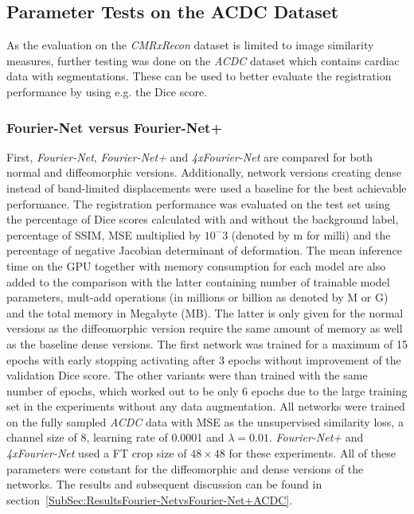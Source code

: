 \documentclass[english,version-2022-01]{uzl-thesis} %
\begin{document}
\subsection{Parameter Tests on the ACDC Dataset} \label{SubSec:ParameterTestsACDC}
As the evaluation on the \emph{CMRxRecon} dataset is limited to image similarity measures, further testing was done on the \emph{ACDC} dataset which contains cardiac data with segmentations. These can be used to better evaluate the registration performance by using e.g. the Dice score.


\subsubsection{Fourier-Net versus Fourier-Net+} \label{SubSubSec:Fourier-NetvsFourier-Net+}
First, \emph{Fourier-Net}, \emph{Fourier-Net+} and \emph{4xFourier-Net} are compared for both normal and diffeomorphic versions. Additionally, network versions creating dense instead of band-limited displacements were used a baseline for the best achievable performance. The registration performance was evaluated on the test set using the percentage of Dice scores calculated with and without the background label, percentage of SSIM, MSE multiplied by $10^-3$ (denoted by m for milli) and the percentage of negative Jacobian determinant of deformation. The mean inference time on the GPU together with memory consumption for each model are also added to the comparison with the latter containing number of trainable model parameters, mult-add operations (in millions or billion as denoted by M or G) and the total memory in Megabyte (MB). The latter is only given for the normal versions as the diffeomorphic version require the same amount of memory as well as the baseline dense versions. The first network was trained for a maximum of 15 epochs with early stopping activating after 3 epochs without improvement of the validation Dice score. The other variants were than trained with the same number of epochs, which worked out to be only 6 epochs due to the large training set in the experiments without any data augmentation. All networks were trained on the fully sampled \emph{ACDC} data with MSE as the unsupervised similarity loss, a channel size of 8, learning rate of 0.0001 and $\lambda=0.01$. \emph{Fourier-Net+} and \emph{4xFourier-Net} used a FT crop size of $48 \times 48$ for these experiments. All of these parameters were constant for the diffeomorphic and dense versions of the networks. The results and subsequent discussion can be found in section~\ref{SubSec:ResultsFourier-NetvsFourier-Net+ACDC}.
\end{document}
